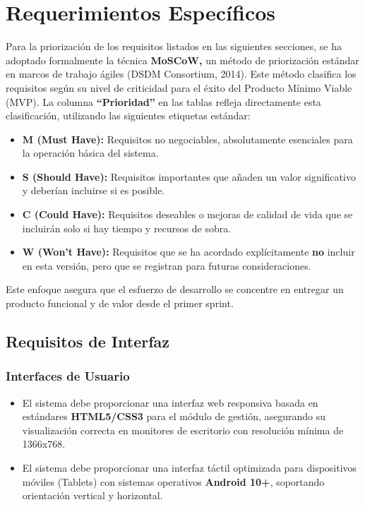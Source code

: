 \section{Requerimientos Específicos}

Para la priorización de los requisitos listados en las siguientes secciones, se ha adoptado formalmente la técnica \textbf{MoSCoW,} un método de priorización estándar en marcos de trabajo ágiles (DSDM Consortium, 2014). Este método clasifica los requisitos según su nivel de criticidad para el éxito del Producto Mínimo Viable (MVP). La columna \textbf{``Prioridad''} en las tablas refleja directamente esta clasificación, utilizando las siguientes etiquetas estándar:

\begin{itemize}
    \item \textbf{M (Must Have):} Requisitos no negociables, absolutamente esenciales para la operación básica del sistema.
    \item \textbf{S (Should Have):} Requisitos importantes que añaden un valor significativo y deberían incluirse si es posible.
    \item \textbf{C (Could Have):} Requisitos deseables o mejoras de calidad de vida que se incluirán solo si hay tiempo y recursos de sobra.
    \item \textbf{W (Won't Have):} Requisitos que se ha acordado explícitamente \textbf{no} incluir en esta versión, pero que se registran para futuras consideraciones.
\end{itemize}

Este enfoque asegura que el esfuerzo de desarrollo se concentre en entregar un producto funcional y de valor desde el primer sprint.

\subsection{Requisitos de Interfaz}

\subsubsection{Interfaces de Usuario}
\begin{itemize}
    \item El sistema debe proporcionar una interfaz web responsiva basada en estándares \textbf{HTML5/CSS3} para el módulo de gestión, asegurando su visualización correcta en monitores de escritorio con resolución mínima de 1366x768.
    \item El sistema debe proporcionar una interfaz táctil optimizada para dispositivos móviles (Tablets) con sistemas operativos \textbf{Android 10+}, soportando orientación vertical y horizontal.
\end{itemize}

